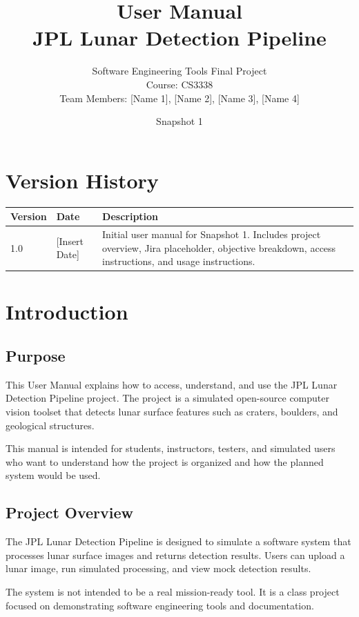 \documentclass[12pt]{article}
\title{
    \textbf{User Manual} \\
    JPL Lunar Detection Pipeline
}
\author{
    Software Engineering Tools Final Project \\
    Course: CS3338 \\
    Team Members: [Name 1], [Name 2], [Name 3], [Name 4]
}
\date{Snapshot 1}
\begin{document}
\maketitle
\newpage

\tableofcontents
\newpage

\section*{Version History}

\begin{longtable}{|p{1.5in}|p{1.5in}|p{3in}|}
\hline
\textbf{Version} & \textbf{Date} & \textbf{Description} \\
\hline
1.0 & [Insert Date] & Initial user manual for Snapshot 1. Includes project overview, Jira placeholder, objective breakdown, access instructions, and usage instructions. \\
\hline
\end{longtable}

\newpage

\section{Introduction}

\subsection{Purpose}

This User Manual explains how to access, understand, and use the JPL Lunar Detection Pipeline project. The project is a simulated open-source computer vision toolset that detects lunar surface features such as craters, boulders, and geological structures.

This manual is intended for students, instructors, testers, and simulated users who want to understand how the project is organized and how the planned system would be used.

\subsection{Project Overview}

The JPL Lunar Detection Pipeline is designed to simulate a software system that processes lunar surface images and returns detection results. Users can upload a lunar image, run simulated processing, and view mock detection results.

The system is not intended to be a real mission-ready tool. It is a class project focused on demonstrating software engineering tools and documentation.
\end{document}
